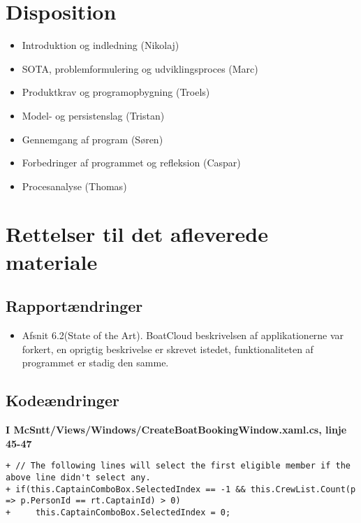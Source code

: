 \documentclass[article,a4paper,11pt,onseside,final]{memoir}
\begin{document}
\chapter{Disposition}

	\begin{itemize}
	\item Introduktion og indledning (Nikolaj)
	\item SOTA, problemformulering og udviklingsproces (Marc)
	\item Produktkrav og programopbygning (Troels)
	\item Model- og persistenslag (Tristan)
	\item Gennemgang af program (Søren)
	\item Forbedringer af programmet og refleksion (Caspar)
	\item Procesanalyse	(Thomas)
	\end{itemize}

\newpage
\chapter{Rettelser til det afleverede materiale}

\section{Rapportændringer}
\begin{itemize}
    \item Afsnit 6.2(State of the Art). BoatCloud beskrivelsen af applikationerne var forkert, en oprigtig beskrivelse er skrevet istedet, funktionaliteten af programmet er stadig den samme.
\end{itemize}

\section{Kodeændringer}

\textbf{I McSntt/Views/Windows/CreateBoatBookingWindow.xaml.cs, linje 45-47}
\lstset{firstnumber=45}
\begin{lstlisting}[frame=single, caption=CreateBoatBookingWindow.cs ændringer, label=fntpg-cb]
+ // The following lines will select the first eligible member if the above line didn't select any.
+ if(this.CaptainComboBox.SelectedIndex == -1 && this.CrewList.Count(p => p.PersonId == rt.CaptainId) > 0) 
+     this.CaptainComboBox.SelectedIndex = 0;
\end{lstlisting}
\end{document}
